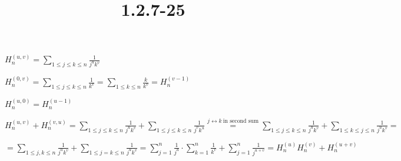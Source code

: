 \documentclass{article}
\title{1.2.7-25}
\begin{document}
\maketitle

\( H_n^{(u,v)} = \sum_{1 \leq j \leq k \leq n} \frac{1}{j^uk^v} \)

\( H_n^{(0,v)} = \sum_{1 \leq j \leq k \leq n} \frac{1}{k^v} = \sum_{1 \leq k \leq n} \frac{k}{k^v} = H_n^{(v-1)} \)

\( H_n^{(u,0)} = H_n^{(u-1)} \)

\( H_n^{(u,v)} + H_n^{(v,u)} = \sum_{1 \leq j \leq k \leq n} \frac{1}{j^uk^v} + \sum_{1 \leq j \leq k \leq n} \frac{1}{j^vk^u} \overset{j \leftrightarrow k\ \textrm{in second sum}}{=} \sum_{1 \leq j \leq k \leq n} \frac{1}{j^uk^v} + \sum_{1 \leq k \leq j \leq n} \frac{1}{j^uk^v} = \)

\( = \sum_{1 \leq j, k \leq n} \frac{1}{j^uk^v} + \sum_{1 \leq j=k \leq n} \frac{1}{j^uk^v} = \sum_{j=1}^n \frac{1}{j^u} \cdot \sum_{k=1}^n \frac{1}{k^v} + \sum_{j=1}^n \frac{1}{j^{u+v}} = H_n^{(u)} H_n^{(v)} + H_n^{(u+v)} \)
\end{document}
